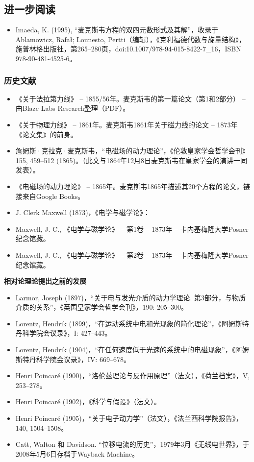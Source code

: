 \subsection{进一步阅读}
\begin{itemize}
\item Imaeda, K. (1995), “麦克斯韦方程的双四元数形式及其解”，收录于Ablamowicz, Rafał; Lounesto, Pertti（编辑），《克利福德代数与旋量结构》，施普林格出版社，第265–280页，doi:10.1007/978-94-015-8422-7_16，ISBN 978-90-481-4525-6。
\end{itemize}

\subsubsection{历史文献}

\begin{itemize}
\item 《关于法拉第力线》 – 1855/56年。麦克斯韦的第一篇论文（第1和2部分） – 由Blaze Labs Research整理（PDF）。
\item 《关于物理力线》 – 1861年。麦克斯韦1861年关于磁力线的论文 – 1873年《论文集》的前身。
\item  詹姆斯·克拉克·麦克斯韦，“电磁场的动力理论”，《伦敦皇家学会哲学会刊》155, 459–512 (1865)。（此文与1864年12月8日麦克斯韦在皇家学会的演讲一同发表）。
\item 《电磁场的动力理论》 – 1865年。麦克斯韦1865年描述其20个方程的论文，链接来自Google Books。
\item J. Clerk Maxwell (1873)，《电学与磁学论》：
\item Maxwell, J. C., 《电学与磁学论》 – 第1卷 – 1873年 – 卡内基梅隆大学Posner纪念馆藏。
\item Maxwell, J. C., 《电学与磁学论》 – 第2卷 – 1873年 – 卡内基梅隆大学Posner纪念馆藏。
\end{itemize}
\textbf{相对论理论提出之前的发展}
\begin{itemize}
\item Larmor, Joseph (1897)，“关于电与发光介质的动力学理论. 第3部分，与物质介质的关系”，《英国皇家学会哲学会刊》，190: 205–300。
\item Lorentz, Hendrik (1899)，“在运动系统中电和光现象的简化理论”，《阿姆斯特丹科学院会议录》，I: 427–443。
\item Lorentz, Hendrik (1904)，“在任何速度低于光速的系统中的电磁现象”，《阿姆斯特丹科学院会议录》，IV: 669–678。
\item Henri Poincaré (1900)，“洛伦兹理论与反作用原理”（法文），《荷兰档案》，V, 253–278。
\item Henri Poincaré (1902)，《科学与假设》（法文）。
\item Henri Poincaré (1905)，“关于电子动力学”（法文），《法兰西科学院报告》，140, 1504–1508。
\item Catt, Walton 和 Davidson. “位移电流的历史”，1979年3月《无线电世界》，于2008年5月6日存档于Wayback Machine。
\end{itemize}
